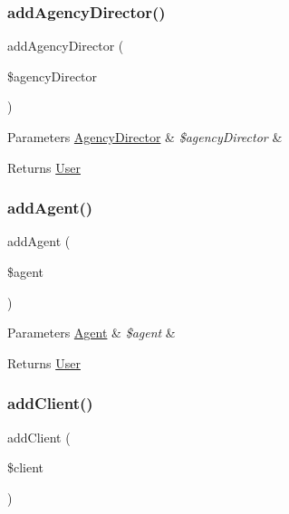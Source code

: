 \subsubsection{\texorpdfstring{addAgencyDirector()}{addAgencyDirector()}}
{\footnotesize\ttfamily add\+Agency\+Director (\begin{DoxyParamCaption}\item[{\mbox{\hyperlink{class_app_1_1_entity_1_1_agency_director}{Agency\+Director}}}]{\$agency\+Director }\end{DoxyParamCaption})}


\begin{DoxyParams}[1]{Parameters}
\mbox{\hyperlink{class_app_1_1_entity_1_1_agency_director}{Agency\+Director}} & {\em \$agency\+Director} & \\
\hline
\end{DoxyParams}
\begin{DoxyReturn}{Returns}
\mbox{\hyperlink{class_app_1_1_entity_1_1_user}{User}} 
\end{DoxyReturn}
\mbox{\label{class_app_1_1_entity_1_1_user_af9b4037bde05427fa94e1f3104de6d97}} 
\subsubsection{\texorpdfstring{addAgent()}{addAgent()}}
{\footnotesize\ttfamily add\+Agent (\begin{DoxyParamCaption}\item[{\mbox{\hyperlink{class_app_1_1_entity_1_1_agent}{Agent}}}]{\$agent }\end{DoxyParamCaption})}


\begin{DoxyParams}[1]{Parameters}
\mbox{\hyperlink{class_app_1_1_entity_1_1_agent}{Agent}} & {\em \$agent} & \\
\hline
\end{DoxyParams}
\begin{DoxyReturn}{Returns}
\mbox{\hyperlink{class_app_1_1_entity_1_1_user}{User}} 
\end{DoxyReturn}
\mbox{\label{class_app_1_1_entity_1_1_user_aea0c1979dbf5609a81ca5b57e6254a16}} 
\subsubsection{\texorpdfstring{addClient()}{addClient()}}
{\footnotesize\ttfamily add\+Client (\begin{DoxyParamCaption}\item[{\mbox{\hyperlink{class_app_1_1_entity_1_1_client}{Client}}}]{\$client }\end{DoxyParamCaption})}


